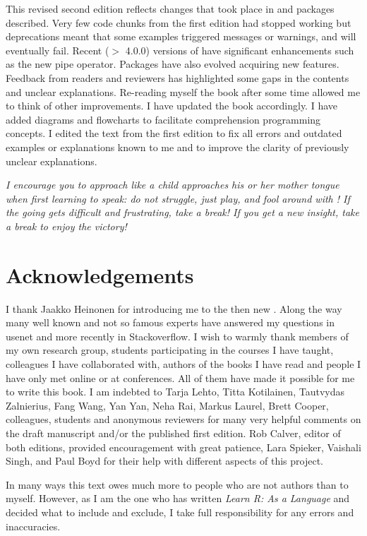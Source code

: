 \documentclass[krantz2]{krantz}\usepackage{knitr}
\begin{document}
This revised second edition reflects changes that took place in \Rlang and packages described. Very few code chunks from the first edition had stopped working but deprecations meant that some examples triggered messages or warnings, and will eventually fail. Recent ($>$ 4.0.0) versions of \Rlang have significant enhancements such as the new pipe operator. Packages have also evolved acquiring new features. Feedback from readers and reviewers has highlighted some gaps in the contents and unclear explanations. Re-reading myself the book after some time allowed me to think of other improvements. I have updated the book accordingly. I have added diagrams and flowcharts to facilitate comprehension programming concepts. I edited the text from the first edition to fix all errors and outdated examples or explanations known to me and to improve the clarity of previously unclear explanations.

\emph{I encourage you to approach \Rlang like a child approaches his or her mother tongue when first learning to speak: do not struggle, just play, and fool around with \Rlang! If the going gets difficult and frustrating, take a break! If you get a new insight, take a break to enjoy the victory!
}%

\section*{Acknowledgements}
I thank Jaakko Heinonen for introducing me to the then new \Rlang. Along the way many well known and not so famous experts have answered my questions in usenet and more recently in Stackoverflow. I wish to warmly thank members of my own research group, students participating in the courses I have taught, colleagues I have collaborated with, authors of the books I have read and people I have only met online or at conferences. All of them have made it possible for me to write this book. I am indebted to Tarja Lehto, Titta Kotilainen, Tautvydas Zalnierius, Fang Wang, Yan Yan, Neha Rai, Markus Laurel, Brett Cooper, colleagues, students and anonymous reviewers for many very helpful comments on the draft manuscript and/or the published first edition. Rob Calver, editor of both editions, provided encouragement with great patience, Lara Spieker, Vaishali Singh, and Paul Boyd for their help with different aspects of this project.

In many ways this text owes much more to people who are not authors than to myself. However, as I am the one who has written \emph{Learn R: As a Language} and decided what to include and exclude, I take full responsibility for any errors and inaccuracies.
\\[1cm]
\end{document}
